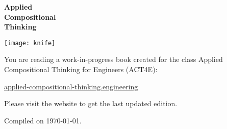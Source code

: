 \thispagestyle{empty}
\begin{center}

    \vspace{3cm}
    {\Huge\bfseries Applied\\Compositional\\Thinking}

\end{center}

\vfill
\begin{center}
    \texttt{[image: knife]}
\end{center}

\vfill
\clearpage

You are reading a work-in-progress book created for the class Applied Compositional Thinking for Engineers (ACT4E):

\href{https://applied-compositional-thinking.engineering}{applied-compositional-thinking.engineering}

Please visit the website to get the last updated edition.

Compiled on \today.

